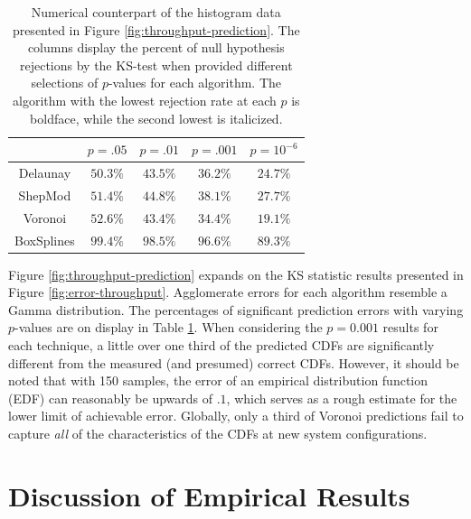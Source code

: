 \begin{table}
  \renewcommand{\arraystretch}{1.3}
  \centering
  \begin{tabular}{c|c|c|c|c}
               & $p = .05$         & $p = .01$         & $p = .001$        & $p = 10^{-6}$\\
    \hline
    Delaunay   & $\mathbf{50.3}\%$ & $\mathit{43.5}\%$ & $\mathit{36.2}\%$ & $\mathit{24.7}\%$\\
    ShepMod    & $\mathit{51.4}\%$ & $44.8\%$          & $38.1\%$          & $27.7\%$\\
    Voronoi    & $52.6\%$          & $\mathbf{43.4}\%$ & $\mathbf{34.4}\%$ & $\mathbf{19.1}\%$\\
    BoxSplines & $99.4\%$          & $98.5\%$          & $96.6\%$          & $89.3\%$\\
  \end{tabular}
  \caption{Numerical counterpart of the histogram data presented in
    Figure \ref{fig:throughput-prediction}. The columns display the
    percent of null hypothesis rejections by the KS-test when provided
    different selections of $p$-values for each algorithm. The
    algorithm with the lowest rejection rate at each $p$ is boldface,
    while the second lowest is italicized.}
  \label{table:null-hypothesis-results}
\end{table}



Figure \ref{fig:throughput-prediction} expands on the KS statistic
results presented in Figure \ref{fig:error-throughput}. Agglomerate
errors for each algorithm resemble a Gamma distribution. The
percentages of significant prediction errors with varying $p$-values
are on display in Table \ref{table:null-hypothesis-results}. When
considering the $p=0.001$ results for each technique, a little over
one third of the predicted CDFs are significantly different from the
measured (and presumed) correct CDFs. However, it should be noted that
with 150 samples, the error of an empirical distribution function
(EDF) can reasonably be upwards of $.1$, which serves as a rough
estimate for the lower limit of achievable error. Globally, only a
third of Voronoi predictions fail to capture \textit{all} of the
characteristics of the CDFs at new system configurations.

\section{Discussion of Empirical Results}
\label{sec:discussion}

